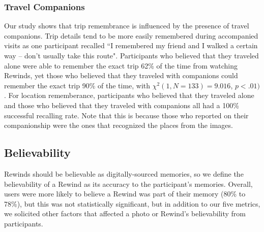 \documentclass{sigchi}
\begin{document}
\subsubsection{Travel Companions}
Our study shows that trip remembrance is influenced by the presence of travel companions. Trip details tend to be more easily remembered during accompanied visits as one participant recalled ``I remembered my friend and I walked a certain way -- don't usually take this route". Participants who believed that they traveled alone were able to remember the exact trip 62\% of the time from watching Rewinds, yet those who believed that they traveled with companions could remember the exact trip 90\% of the time, with $\chi^2(1, N=133) = 9.016$, $p <.01)$. For location rememberance, participants who believed that they traveled alone and those who believed that they traveled with companions all had a 100\% successful recalling rate. Note that this is because those who reported on their companionship were the ones that recognized the places from the images. 




\subsection{Believability}
Rewinds should be believable as digitally-sourced memories, so we define the believability of a Rewind as its accuracy to the participant's memories.
Overall, users were more likely to believe a Rewind was part of their memory (80\% to 78\%), but this was not statistically significant,
but in addition to our five metrics, we solicited other factors that affected a photo or Rewind's believability from participants.
\end{document}
